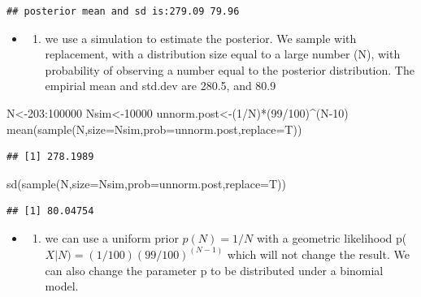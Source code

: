 \documentclass[
]{book}
\newenvironment{Shaded}{\begin{snugshade}}{\end{snugshade}}
\newcommand{\AttributeTok}[1]{\textcolor[rgb]{0.77,0.63,0.00}{#1}}
\newcommand{\DecValTok}[1]{\textcolor[rgb]{0.00,0.00,0.81}{#1}}
\newcommand{\FunctionTok}[1]{\textcolor[rgb]{0.00,0.00,0.00}{#1}}
\newcommand{\NormalTok}[1]{#1}
\newcommand{\OtherTok}[1]{\textcolor[rgb]{0.56,0.35,0.01}{#1}}
\newcommand{\SpecialCharTok}[1]{\textcolor[rgb]{0.00,0.00,0.00}{#1}}
\providecommand{\tightlist}{%
  \setlength{\itemsep}{0pt}\setlength{\parskip}{0pt}}
\theoremstyle{definition}
\theoremstyle{definition}
\theoremstyle{definition}
\theoremstyle{definition}
\theoremstyle{remark}
\begin{document}
\begin{verbatim}
## posterior mean and sd is:279.09 79.96
\end{verbatim}

\begin{itemize}
\item
  \begin{enumerate}
  \def\labelenumi{(\alph{enumi})}
  \setcounter{enumi}{1}
  \tightlist
  \item
    we use a simulation to estimate the posterior. We sample with replacement, with a distribution size equal to a large number (N), with probability of observing a number equal to the posterior distribution. The empirial mean and std.dev are 280.5, and 80.9
  \end{enumerate}
\end{itemize}

\begin{Shaded}
\begin{Highlighting}[]
\NormalTok{ N}\OtherTok{\textless{}{-}}\DecValTok{203}\SpecialCharTok{:}\DecValTok{100000}
\NormalTok{ Nsim}\OtherTok{\textless{}{-}}\DecValTok{10000}
\NormalTok{ unnorm.post}\OtherTok{\textless{}{-}}\NormalTok{(}\DecValTok{1}\SpecialCharTok{/}\NormalTok{N)}\SpecialCharTok{*}\NormalTok{(}\DecValTok{99}\SpecialCharTok{/}\DecValTok{100}\NormalTok{)}\SpecialCharTok{\^{}}\NormalTok{(N}\DecValTok{{-}10}\NormalTok{)}
 \FunctionTok{mean}\NormalTok{(}\FunctionTok{sample}\NormalTok{(N,}\AttributeTok{size=}\NormalTok{Nsim,}\AttributeTok{prob=}\NormalTok{unnorm.post,}\AttributeTok{replace=}\NormalTok{T))}
\end{Highlighting}
\end{Shaded}

\begin{verbatim}
## [1] 278.1989
\end{verbatim}

\begin{Shaded}
\begin{Highlighting}[]
 \FunctionTok{sd}\NormalTok{(}\FunctionTok{sample}\NormalTok{(N,}\AttributeTok{size=}\NormalTok{Nsim,}\AttributeTok{prob=}\NormalTok{unnorm.post,}\AttributeTok{replace=}\NormalTok{T))}
\end{Highlighting}
\end{Shaded}

\begin{verbatim}
## [1] 80.04754
\end{verbatim}

\begin{itemize}
\item
  \begin{enumerate}
  \def\labelenumi{(\alph{enumi})}
  \setcounter{enumi}{2}
  \tightlist
  \item
    we can use a uniform prior \(p(N) = 1/N\) with a geometric likelihood p(\(X|N)=(1/100)(99/100)^(N-1)\) which will not change the result. We can also change the parameter p to be distributed under a binomial model.
  \end{enumerate}
\end{itemize}
\end{document}
